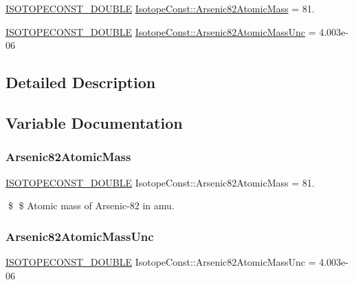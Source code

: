 \begin{DoxyCompactItemize}
\item 
\mbox{\hyperlink{group___isotope_const-_macros_ga8f45a7272ce02c0b4c65c44636ed719a}{I\+S\+O\+T\+O\+P\+E\+C\+O\+N\+S\+T\+\_\+\+D\+O\+U\+B\+LE}} \mbox{\hyperlink{group___isotope_const-_arsenic-_as82_ga7a432fdbeb88b9839cd4d7bf39b11a0b}{Isotope\+Const\+::\+Arsenic82\+Atomic\+Mass}} = 81.
\item 
\mbox{\hyperlink{group___isotope_const-_macros_ga8f45a7272ce02c0b4c65c44636ed719a}{I\+S\+O\+T\+O\+P\+E\+C\+O\+N\+S\+T\+\_\+\+D\+O\+U\+B\+LE}} \mbox{\hyperlink{group___isotope_const-_arsenic-_as82_gaa1a54516d3d03d2d368c4e737e1403ae}{Isotope\+Const\+::\+Arsenic82\+Atomic\+Mass\+Unc}} = 4.\+003e-\/06
\end{DoxyCompactItemize}


\subsection{Detailed Description}


\subsection{Variable Documentation}
\mbox{\label{group___isotope_const-_arsenic-_as82_ga7a432fdbeb88b9839cd4d7bf39b11a0b}} 
\subsubsection{\texorpdfstring{Arsenic82\+Atomic\+Mass}{Arsenic82AtomicMass}}
{\footnotesize\ttfamily \mbox{\hyperlink{group___isotope_const-_macros_ga8f45a7272ce02c0b4c65c44636ed719a}{I\+S\+O\+T\+O\+P\+E\+C\+O\+N\+S\+T\+\_\+\+D\+O\+U\+B\+LE}} Isotope\+Const\+::\+Arsenic82\+Atomic\+Mass = 81.}

\$ \$ Atomic mass of Arsenic-\/82 in amu. \mbox{\label{group___isotope_const-_arsenic-_as82_gaa1a54516d3d03d2d368c4e737e1403ae}} 
\subsubsection{\texorpdfstring{Arsenic82\+Atomic\+Mass\+Unc}{Arsenic82AtomicMassUnc}}
{\footnotesize\ttfamily \mbox{\hyperlink{group___isotope_const-_macros_ga8f45a7272ce02c0b4c65c44636ed719a}{I\+S\+O\+T\+O\+P\+E\+C\+O\+N\+S\+T\+\_\+\+D\+O\+U\+B\+LE}} Isotope\+Const\+::\+Arsenic82\+Atomic\+Mass\+Unc = 4.\+003e-\/06}

